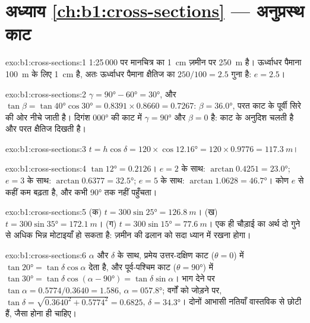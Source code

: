 \section*{अध्याय \ref{ch:b1:cross-sections} --- अनुप्रस्थ काट}

\begin{solution}{exo:b1:cross-sections:1}
1:25\,000 पर मानचित्र का \qty{1}{cm} ज़मीन पर \qty{250}{m} है। ऊर्ध्वाधर पैमाना \qty{100}{m} के लिए \qty{1}{cm} है, अतः
ऊर्ध्वाधर पैमाना क्षैतिज का $250/100 = 2.5$ गुना है: $e = 2.5$।
\end{solution}

\begin{solution}{exo:b1:cross-sections:2}
$\gamma = \ang{90} - \ang{60} = \ang{30}$, और $\tan\beta = \tan\ang{40}
\cos\ang{30} = 0.8391\times0.8660 = 0.7267$: $\beta = \ang{36.0}$, परत काट के पूर्वी सिरे की ओर नीचे जाती है। दिगंश
\ang{000} की काट में $\gamma = \ang{90}$ और $\beta = 0$ है: काट  के अनुदिश चलती है और परत क्षैतिज दिखती है।
\end{solution}

\begin{solution}{exo:b1:cross-sections:3}
$t = h\cos\delta = 120\times\cos\ang{12.16} = 120\times0.9776 =
\qty{117.3}{m}$।
\end{solution}

\begin{solution}{exo:b1:cross-sections:4}
$\tan\ang{12} = 0.2126$। $e = 2$ के साथ: $\arctan 0.4251 = \ang{23.0}$; $e = 3$ के साथ:
$\arctan 0.6377 = \ang{32.5}$; $e = 5$ के साथ: $\arctan 1.0628 =
\ang{46.7}$। कोण $e$ से कहीं कम बढ़ता है, और कभी \ang{90} तक नहीं पहुँचता।
\end{solution}

\begin{solution}{exo:b1:cross-sections:5}
(क) $t = 300\sin\ang{25} = \qty{126.8}{m}$। (ख) $t = 300\sin\ang{35} =
\qty{172.1}{m}$। (ग) $t = 300\sin\ang{15} = \qty{77.6}{m}$। एक ही  चौड़ाई का अर्थ दो गुने से अधिक भिन्न
मोटाइयाँ हो सकता है: ज़मीन की ढलान को सदा ध्यान में रखना होगा।
\end{solution}

\begin{solution}{exo:b1:cross-sections:6}
 $\alpha$ और  $\delta$ के साथ, प्रमेय उत्तर-दक्षिण काट ($\theta = 0$) में $\tan\ang{20} = \tan\delta\cos\alpha$
देता है, और पूर्व-पश्चिम काट ($\theta = \ang{90}$) में $\tan\ang{30} =
\tan\delta\cos(\alpha - \ang{90}) = \tan\delta\sin\alpha$। भाग देने पर
$\tan\alpha = 0.5774/0.3640 = 1.586$, $\alpha = \ang{057.8}$; वर्गों को जोड़ने पर,
$\tan\delta = \sqrt{0.3640^2 + 0.5774^2} = 0.6825$, $\delta =
\ang{34.3}$। दोनों आभासी नतियाँ वास्तविक  से छोटी हैं, जैसा होना ही चाहिए।
\end{solution}

